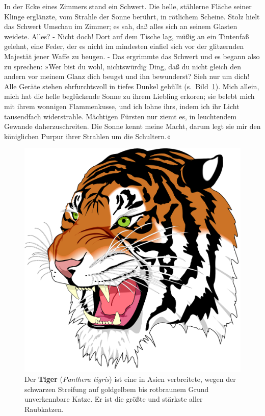 In der Ecke eines Zimmers stand ein Schwert. Die helle, stählerne Fläche seiner
Klinge erglänzte, vom Strahle der Sonne berührt, in rötlichem Scheine. Stolz
hielt das Schwert Umschau im Zimmer; es sah, daß alles sich an seinem Glasten
weidete. Alles? - Nicht doch! Dort auf dem Tische lag, müßig an ein Tintenfaß 
gelehnt, eine Feder, der es nicht im mindesten einfiel sich vor der
glitzernden Majestät jener Waffe zu beugen. - Das ergrimmte das Schwert und es
begann also zu sprechen: »Wer bist du wohl, nichtswürdig Ding, daß du nicht
gleich den andern vor meinem Glanz dich beugst und ihn bewunderst? Sieh nur
um dich! Alle Geräte stehen ehrfurchtsvoll in tiefes Dunkel gehüllt (s.\ Bild~\ref{fig:bild1}). Mich
allein, mich hat die helle beglückende Sonne zu ihrem Liebling erkoren; sie
belebt mich mit ihrem wonnigen Flammenkusse, und ich lohne ihrs, indem ich ihr
Licht tausendfach widerstrahle. Mächtigen Fürsten nur ziemt es, in leuchtendem
Gewande daherzuschreiten. Die Sonne kennt meine Macht, darum legt sie mir den
königlichen Purpur ihrer Strahlen um die Schultern.«

\begin{figure}[t]\centering
  \includegraphics[width = 120mm]{bilder/DemoFile_tiger}
  \caption{Der {\bf Tiger} ({\em Panthera tigris}) ist eine in Asien
           verbreitete, wegen der schwarzen Streifung auf goldgelbem bis
	   rotbraunem Grund unverkennbare Katze. Er ist die größte und
	   stärkste aller Raubkatzen.}\label{fig:bild1}
\end{figure}

